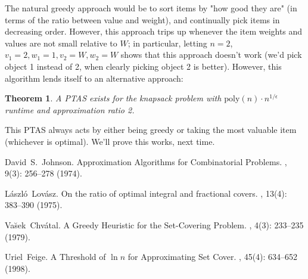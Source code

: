 \documentclass[11pt]{article}
\newtheorem{theorem}{Theorem}[section]
\begin{document}
The natural greedy approach would be to sort items by "how good they are" (in terms of the ratio between value and weight), and continually pick items in decreasing order.  However, this approach trips up whenever the item weights and values are not small relative to $W$; in particular, letting $n = 2$, $v_1 = 2, w_1 = 1, v_2 = W, w_2 = W$ shows that this approach doesn't work (we'd pick object 1 instead of 2, when clearly picking object 2 is better).  However, this algorithm lends itself to an alternative approach:

\begin{shaded}\begin{theorem}
A PTAS exists for the knapsack problem with $\text{poly}(n) \cdot n^{1/\epsilon}$ runtime and approximation ratio 2.
\end{theorem}\end{shaded}

This PTAS always acts by either being greedy or taking the most valuable item (whichever is optimal).  We'll prove this works, next time.

\newpage

\begin{thebibliography}{42}

David~S.~Johnson.
\newblock Approximation Algorithms for Combinatorial Problems.
, 9(3): 256--278 (1974).

L\'{a}szl\'{o}~Lov\'{a}sz.
\newblock On the ratio of optimal integral and fractional covers.
, 13(4): 383--390 (1975).

Va\u{s}ek~Chv\'{a}tal.
\newblock A Greedy Heuristic for the Set-Covering Problem.
, 4(3): 233--235 (1979).

Uriel~Feige.
\newblock A Threshold of $\ln n$ for Approximating Set Cover. 
, 45(4): 634--652 (1998).

\end{thebibliography}
\end{document}
